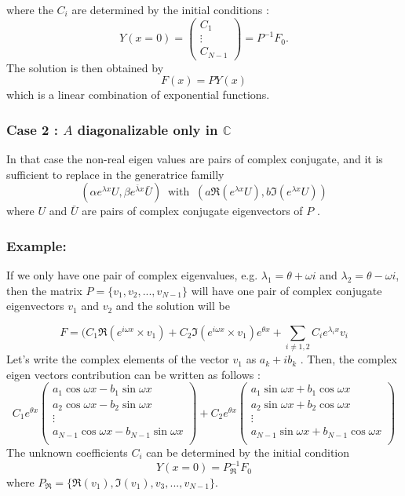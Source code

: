 \documentclass[a4paper,12pt]{article}
\begin{document}
 where the $C_i$ are determined by the initial conditions : 
  \begin{equation}
 Y(x=0) =  \begin{pmatrix}
 C_1 \\
  \vdots\\
 C_{N-1}\end{pmatrix}  = P^{-1} F_0. 
 \end{equation}
 The solution is then obtained by 
   \begin{equation}
  F(x)=PY(x)
  \end{equation}
which is a linear combination of exponential functions.

 \subsubsection*{Case 2 : $A$ diagonalizable only in $\mathbb{C}$}
In that case the non-real eigen values are pairs of complex conjugate, and it is sufficient to replace in the generatrice familly 
$$ (\alpha e^{\lambda x} U ,  \beta e^{ \bar{\lambda} x} \bar{U}) \ \text{ with } \ (a\Re( e^{\lambda x} U ),  b \Im( e^{\lambda x} U) )$$
 where $U$ and $\bar{U}$ are pairs of complex conjugate eigenvectors of $P$ . 
\subsubsection*{Example:} 
If we only have one pair of complex eigenvalues, e.g. $\lambda_1 = \theta + \omega i $ and $\lambda_2 = \theta - \omega i $, then the matrix $P= \{ v_1,v_2, ..., v_{N-1}\}$ will have one pair of complex conjugate eigenvectors $v_1$ and $v_2$ and the solution will be
 
 \begin{equation}
 F = (C_1 \Re( e^{i \omega  x}  \times v_1) + C_2 \Im(e^{i \omega x} \times v_1 ) e^{\theta x} +  \sum_{i \neq 1,2} C_i e^{\lambda_i x} v_i
\end{equation}  
Let's write the complex elements of the vector $v_1$ as $a_k + i b_k$ . Then, the complex eigen vectors contribution can be written as follows :
 \begin{equation}
 C_1  e^{\theta x} \begin{pmatrix}
 a_1 \cos\omega x - b_1 \sin \omega x \\ 
 a_2 \cos\omega x - b_2 \sin \omega x\\
 \vdots\\
 a_{N-1} \cos\omega x - b_{N-1} \sin\omega x \\ \end{pmatrix} + 
 C_2  e^{\theta x} \begin{pmatrix}
 a_1 \sin \omega x + b_1 \cos \omega x \\ 
 a_2 \sin \omega x + b_2 \cos \omega x\\
 \vdots\\
 a_{N-1} \sin \omega x + b_{N-1} \cos \omega x \\ \end{pmatrix} 
 \end{equation}
 The unknown coefficients $C_i$ can be determined by the initial condition 
 $$ Y(x=0) = P_{\Re}^{-1} F_0 $$
 where $P_{\Re} = \{ \Re{(v_1)}, \Im{(v_1)}, v_3, ... , v_{N-1} \}$.
\end{document}
